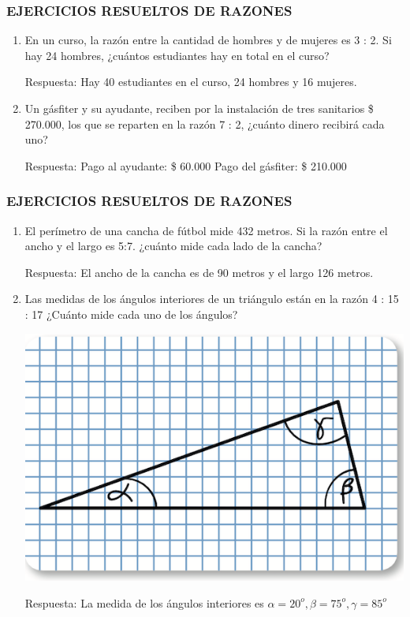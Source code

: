 \begin{frame}
    \frametitle{EJERCICIOS RESUELTOS DE RAZONES}


\begin{enumerate}
\item En un curso, la razón entre la cantidad de hombres y de mujeres es 3 : 2. Si hay 24 hombres, ¿cuántos estudiantes hay en 
total en el curso?

\hfill

{\small
Respuesta: Hay 40 estudiantes en el curso, 24 hombres y 16 mujeres.
}

\item Un gásfiter y su ayudante, reciben por la instalación de tres sanitarios \$ 270.000, los que se reparten en la razón 7 : 
2, 
¿cuánto dinero recibirá cada uno?

\hfill

{\small
Respuesta: Pago al ayudante: \$ 60.000  Pago del gásfiter: \$ 210.000
}
\end{enumerate}

\end{frame}

\begin{frame}
    \frametitle{EJERCICIOS RESUELTOS DE RAZONES}


\begin{enumerate}

\item El perímetro de una cancha de fútbol mide 432 metros. Si la razón entre el ancho y el 
largo es 5:7. ¿cuánto mide cada lado de la cancha?

\hfill

{\small
Respuesta: El ancho de la cancha es de 90 metros y el largo 126 metros.
}

\item Las medidas de los ángulos interiores de un triángulo están en la razón 4 : 15 : 17 ¿Cuánto mide cada uno de los 
ángulos?

\includegraphics[scale=.3]{rectan}
\hfill

{\small
Respuesta: La medida de los ángulos interiores es $\alpha= 20^o, \beta = 75^o, \gamma= 85^o$
}

\end{enumerate}

\end{frame}
